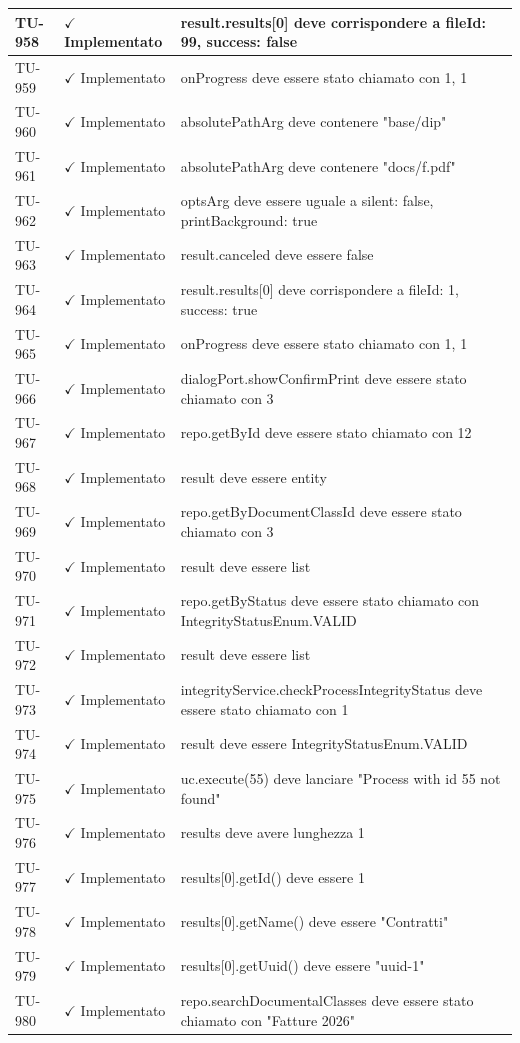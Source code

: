 ﻿\documentclass[a4paper,12pt]{article}
\newcommand{\ok}{\textcolor{green!60!black}{$\checkmark$ Implementato}}
\begin{document}
\begin{longtable}{|p{2cm}|p{3.5cm}|p{9.5cm}|}
\hline
TU-958 & \ok & result.results[0] deve corrispondere a { fileId: 99, success: false } \\
\hline
TU-959 & \ok & onProgress deve essere stato chiamato con 1, 1 \\
\hline
TU-960 & \ok & absolutePathArg deve contenere "base/dip" \\
\hline
TU-961 & \ok & absolutePathArg deve contenere "docs/f.pdf" \\
\hline
TU-962 & \ok & optsArg deve essere uguale a { silent: false, printBackground: true } \\
\hline
TU-963 & \ok & result.canceled deve essere false \\
\hline
TU-964 & \ok & result.results[0] deve corrispondere a { fileId: 1, success: true } \\
\hline
TU-965 & \ok & onProgress deve essere stato chiamato con 1, 1 \\
\hline
TU-966 & \ok & dialogPort.showConfirmPrint deve essere stato chiamato con 3 \\
\hline
TU-967 & \ok & repo.getById deve essere stato chiamato con 12 \\
\hline
TU-968 & \ok & result deve essere entity \\
\hline
TU-969 & \ok & repo.getByDocumentClassId deve essere stato chiamato con 3 \\
\hline
TU-970 & \ok & result deve essere list \\
\hline
TU-971 & \ok & repo.getByStatus deve essere stato chiamato con IntegrityStatusEnum.VALID \\
\hline
TU-972 & \ok & result deve essere list \\
\hline
TU-973 & \ok & integrityService.checkProcessIntegrityStatus deve essere stato chiamato con 1 \\
\hline
TU-974 & \ok & result deve essere IntegrityStatusEnum.VALID \\
\hline
TU-975 & \ok & uc.execute(55) deve lanciare "Process with id 55 not found" \\
\hline
TU-976 & \ok & results deve avere lunghezza 1 \\
\hline
TU-977 & \ok & results[0].getId() deve essere 1 \\
\hline
TU-978 & \ok & results[0].getName() deve essere "Contratti" \\
\hline
TU-979 & \ok & results[0].getUuid() deve essere "uuid-1" \\
\hline
TU-980 & \ok & repo.searchDocumentalClasses deve essere stato chiamato con "Fatture 2026" \\

\end{longtable}
\end{document}
